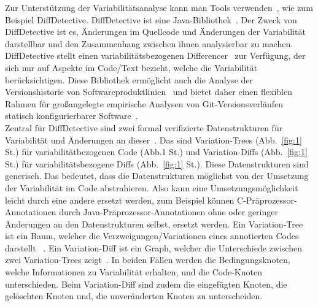 \documentclass[11pt,a4paper,oneside]{article}
\newcommand*\numcircledtikz[1]{\tikz[baseline=(char.base)]{
		\node[circle,draw,double,inner sep=1.2pt] (char) {#1};}}
\begin{document}
	
	
	Zur Unterstützung der Variabilitätsanalyse kann man Tools verwenden~\cite{SSK+:VaMoS20,10.1145/2660190.2662113}, wie zum Beispiel DiffDetective. DiffDetective ist eine Java-Bibliothek~\cite{BSM+:FSE24}. Der Zweck von DiffDetective ist es, Änderungen im Quellcode und Änderungen der Variabilität darstellbar und den Zusammenhang zwischen ihnen analysierbar zu machen. DiffDetective stellt einen variabilitätsbezogenen Differencer~\cite{BSM+:FSE24,BTS+:ESECFSE22} zur Verfügung, der sich nur auf Aspekte im Code/Text bezieht, welche die Variabilität berücksichtigen. Diese Bibliothek ermöglicht auch die Analyse der Versionshistorie von Softwareproduktlinien~\cite{BTS+:ESECFSE22} und bietet daher einen flexiblen Rahmen für großangelegte empirische Analysen von Git-Versionsverläufen statisch konfigurierbarer Software~\cite{BSM+:FSE24,BSG+:SPLC23}.\\
	 
	Zentral für DiffDetective sind zwei formal verifizierte Datenstrukturen für Variabilität und Änderungen an dieser~\cite{BTS+:ESECFSE22}. Das sind Variation-Trees (Abb.~\ref{fig:1} St.\numcircledtikz{x}) für variabilitätbezogenen Code (Abb.1 St.\numcircledtikz{v}) und Variation-Diffs (Abb.~\ref{fig:1} St.\numcircledtikz{y}) für variabilitätsbezogene Diffs (Abb.~\ref{fig:1} St.\numcircledtikz{w}). Diese Datenstrukturen sind generisch. Das bedeutet, dass die Datenstrukturen möglichst von der Umsetzung der Variabilität im Code abstrahieren. Also kann eine Umsetzungsmöglichkeit leicht durch eine andere ersetzt werden, zum Beispiel können C-Präprozessor-Annotationen  durch Java-Präprozessor-Annotationen ohne oder geringer Änderungen an den Datenstrukturen selbst, ersetzt werden. Ein Variation-Tree ist ein Baum, welcher die Verzweigungen/Variationen eines annotierten Codes darstellt ~\cite{BSM+:FSE24,BTS+:ESECFSE22,BSG+:SPLC23}. Ein Variation-Diff ist ein Graph, welcher die Unterschiede zwischen zwei Variation-Trees zeigt~\cite{BSM+:FSE24,BTS+:ESECFSE22,BSG+:SPLC23}. In beiden Fällen werden die Bedingungsknoten, welche Informationen zu Variabilität erhalten, und die Code-Knoten unterschieden. Beim Variation-Diff sind zudem die eingefügten Knoten, die gelöschten Knoten und, die unveränderten Knoten zu unterscheiden.\\
	 
	
	
\end{document}
